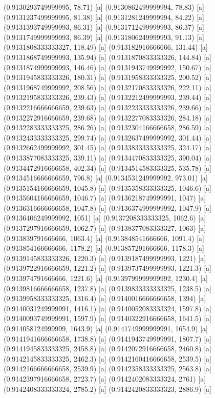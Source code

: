{{{(0.9130293749999995, 78.71) [a] 
(0.9130862499999994, 78.83) [a] 
(0.9131237499999995, 81.38) [a] 
(0.9131281249999994, 84.22) [a] 
(0.9131393749999993, 86.31) [a] 
(0.9131712499999993, 86.37) [a] 
(0.9131749999999993, 86.39) [a] 
(0.9131806249999993, 91.13) [a] 
(0.9131808333333327, 118.49) [a] 
(0.913182916666666, 131.44) [a] 
(0.9131868749999993, 135.94) [a] 
(0.9131870833333326, 144.84) [a] 
(0.9131874999999993, 146.46) [a] 
(0.9131943749999992, 150.67) [a] 
(0.9131945833333326, 180.31) [a] 
(0.9131958333333325, 200.52) [a] 
(0.9131968749999992, 208.56) [a] 
(0.9132170833333326, 222.11) [a] 
(0.9132195833333326, 239.43) [a] 
(0.9132212499999993, 239.44) [a] 
(0.9132216666666659, 239.63) [a] 
(0.9132233333333326, 239.66) [a] 
(0.9132272916666659, 239.68) [a] 
(0.9132277083333326, 284.18) [a] 
(0.9132283333333325, 286.26) [a] 
(0.9132304166666658, 286.59) [a] 
(0.9132433333333325, 299.74) [a] 
(0.9132637499999992, 301.44) [a] 
(0.9132662499999992, 301.45) [a] 
(0.9133833333333325, 324.17) [a] 
(0.9133877083333325, 339.11) [a] 
(0.9134470833333325, 390.04) [a] 
(0.9134472916666658, 402.34) [a] 
(0.9134514583333325, 535.78) [a] 
(0.9134516666666659, 796.8) [a] 
(0.9134531249999992, 973.01) [a] 
(0.9135154166666659, 1045.8) [a] 
(0.9135358333333325, 1046.6) [a] 
(0.9135604166666659, 1046.7) [a] 
(0.9136218749999991, 1047) [a] 
(0.9136316666666658, 1047.8) [a] 
(0.9136374999999992, 1047.9) [a] 
(0.9136406249999992, 1051) [a] 
(0.9137208333333325, 1062.6) [a] 
(0.9137297916666659, 1062.7) [a] 
(0.9138377083333327, 1063) [a] 
(0.913839791666666, 1063.4) [a] 
(0.913848541666666, 1091.4) [a] 
(0.913854166666666, 1178.2) [a] 
(0.913857291666666, 1178.3) [a] 
(0.9139145833333326, 1220.3) [a] 
(0.9139187499999993, 1221) [a] 
(0.9139722916666659, 1221.2) [a] 
(0.9139737499999993, 1221.3) [a] 
(0.913974791666666, 1221.6) [a] 
(0.9139799999999992, 1230.4) [a] 
(0.9139816666666658, 1237.8) [a] 
(0.9139833333333325, 1238.5) [a] 
(0.9139958333333325, 1316.4) [a] 
(0.9140016666666658, 1394) [a] 
(0.9140031249999991, 1416.1) [a] 
(0.9140052083333324, 1597.8) [a] 
(0.9140093749999991, 1597.9) [a] 
(0.9140322916666658, 1641.5) [a] 
(0.914058124999999, 1643.9) [a] 
(0.9141749999999991, 1654.9) [a] 
(0.9141941666666658, 1738.8) [a] 
(0.9141943749999991, 1807.7) [a] 
(0.9141945833333325, 2458.8) [a] 
(0.9142072916666658, 2460.8) [a] 
(0.9142145833333325, 2462.3) [a] 
(0.9142160416666658, 2539.5) [a] 
(0.9142166666666658, 2539.9) [a] 
(0.9142358333333325, 2563.8) [a] 
(0.9142397916666658, 2723.7) [a] 
(0.9142402083333324, 2761) [a] 
(0.9142408333333324, 2785.2) [a] 
(0.9142420833333323, 2886.9) [a] 
}}}
